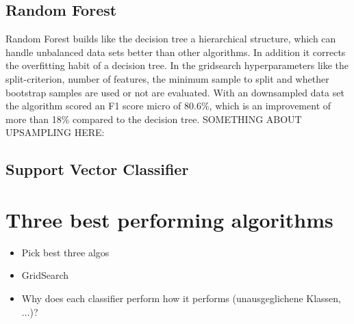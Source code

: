 \subsection{Random Forest}
Random Forest builds like the decision tree a hierarchical structure, which can handle unbalanced data sets better than other algorithms. In addition it corrects the overfitting habit of a decision tree. In the gridsearch hyperparameters like the split-criterion, number of features, the minimum sample to split and whether bootstrap samples are used or not are evaluated.
With an downsampled data set the algorithm scored an F1 score micro of 80.6\%, which is an improvement of more than 18\% compared to the decision tree.
SOMETHING ABOUT UPSAMPLING HERE:

\subsection{Support Vector Classifier}

\section{Three best performing algorithms}
\begin{itemize}
	\item Pick best three algos
	\item GridSearch
	\item Why does each classifier perform how it performs (unausgeglichene Klassen, ...)?
\end{itemize}
